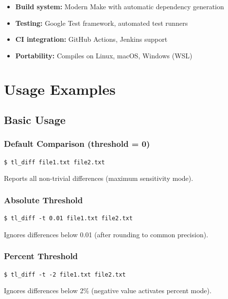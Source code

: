 \documentclass[11pt,letterpaper]{article}
\begin{document}
\begin{itemize}
    \item \textbf{Build system:} Modern Make with automatic dependency generation
    \item \textbf{Testing:} Google Test framework, automated test runners
    \item \textbf{CI integration:} GitHub Actions, Jenkins support
    \item \textbf{Portability:} Compiles on Linux, macOS, Windows (WSL)
\end{itemize}

\section{Usage Examples}
\label{sec:examples}

\subsection{Basic Usage}

\subsubsection{Default Comparison (threshold = 0)}

\begin{verbatim}
$ tl_diff file1.txt file2.txt
\end{verbatim}

Reports all non-trivial differences (maximum sensitivity mode).

\subsubsection{Absolute Threshold}

\begin{verbatim}
$ tl_diff -t 0.01 file1.txt file2.txt
\end{verbatim}

Ignores differences below 0.01 (after rounding to common precision).

\subsubsection{Percent Threshold}

\begin{verbatim}
$ tl_diff -t -2 file1.txt file2.txt
\end{verbatim}

Ignores differences below 2\% (negative value activates percent mode).
\end{document}

